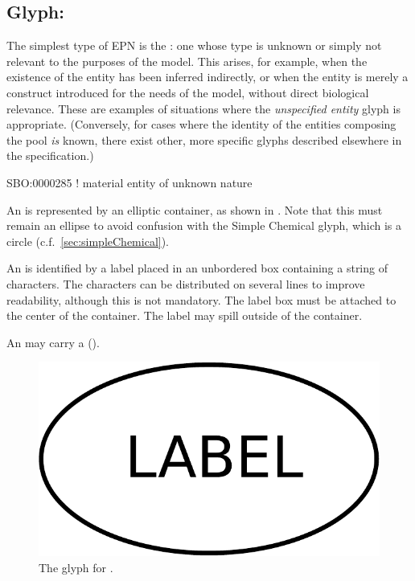 
\subsection{Glyph: }
\label{sec:unspecifiedEntity}

The simplest type of EPN is the : one whose type is unknown or simply not relevant to the purposes of the model.  This arises, for example, when the existence of the entity has been inferred indirectly, or when the entity is merely a construct introduced for the needs of the model, without direct biological relevance.  These are examples of situations where the \emph{unspecified entity} glyph is appropriate.  (Conversely, for cases where the identity of the entities composing the pool \emph{is} known, there exist other, more specific glyphs described elsewhere in the \SBGNPDLone specification.)

\begin{glyphDescription}

\glyphSboTerm SBO:0000285 ! material entity of unknown nature 

\glyphContainer An  is represented by an
elliptic container, as shown in .  Note that this
must remain an ellipse to avoid confusion with the Simple Chemical
glyph, which is a circle (c.f.\, \ref{sec:simpleChemical}).


\glyphLabel An  is identified by a label
placed in an unbordered box containing a string of characters.  The
characters can be distributed on several lines to improve readability,
although this is not mandatory.  The label box must be attached to the
center of the container.  The label may spill outside of the
container.

\glyphAux An  may carry a  ().

\end{glyphDescription}

\begin{figure}[H]
  \centering
  \includegraphics[scale = 0.3]{images/unspecified}
  \caption{The \PD glyph for .}
  \label{fig:unspecified}
\end{figure}



